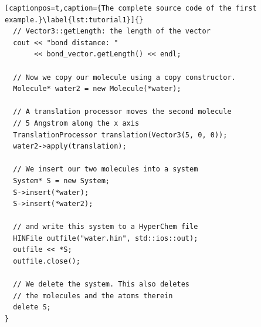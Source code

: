 \begin{lstlisting}[captionpos=t,caption={The complete source code of the first example.}\label{lst:tutorial1}]{}
  // Vector3::getLength: the length of the vector
  cout << "bond distance: " 
       << bond_vector.getLength() << endl;

  // Now we copy our molecule using a copy constructor.
  Molecule* water2 = new Molecule(*water);

  // A translation processor moves the second molecule
  // 5 Angstrom along the x axis
  TranslationProcessor translation(Vector3(5, 0, 0));
  water2->apply(translation);

  // We insert our two molecules into a system
  System* S = new System;
  S->insert(*water);
  S->insert(*water2);

  // and write this system to a HyperChem file
  HINFile outfile("water.hin", std::ios::out);
  outfile << *S;
  outfile.close();

  // We delete the system. This also deletes 
  // the molecules and the atoms therein
  delete S;
}
\end{lstlisting}
